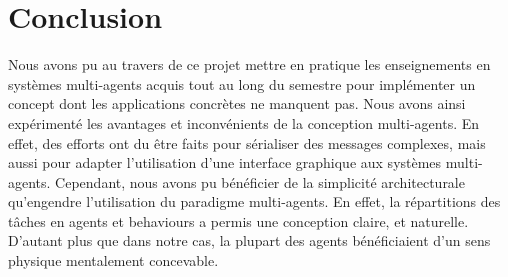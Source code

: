 \documentclass[11pt]{report}
\begin{document}
\newpage

\section{Conclusion}

Nous avons pu au travers de ce projet mettre en pratique les enseignements en systèmes multi-agents acquis tout au long du semestre pour implémenter un concept dont les applications concrètes ne manquent pas. Nous avons ainsi expérimenté les avantages et inconvénients de la conception multi-agents. En effet, des efforts ont du être faits pour sérialiser des messages complexes, mais aussi pour adapter l'utilisation d'une interface graphique aux systèmes multi-agents. Cependant, nous avons pu bénéficier de la simplicité architecturale qu'engendre l'utilisation du paradigme multi-agents. En effet, la répartitions des tâches en agents et behaviours a permis une conception claire, et naturelle. D'autant plus que dans notre cas, la plupart des agents bénéficiaient d'un sens physique mentalement concevable.
\end{document}
